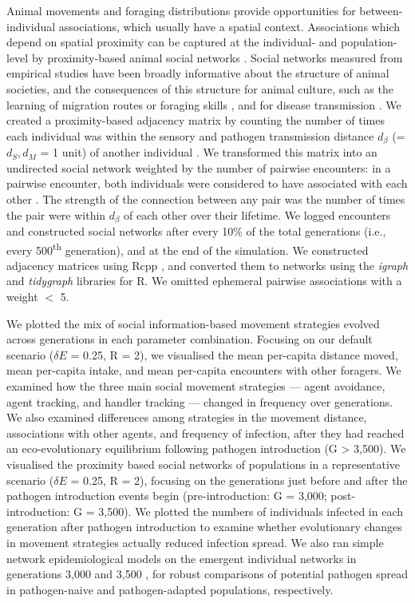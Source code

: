 Animal movements and foraging distributions provide opportunities for between-individual associations, which usually have a spatial context.
Associations which depend on spatial proximity can be captured at the individual- and population-level by proximity-based animal social networks \citep{whitehead2008,farine2015}.
Social networks measured from empirical studies have been broadly informative about the structure of animal societies, and the consequences of this structure for animal culture, such as the learning of migration routes or foraging skills \citep{aplin2012,aplin2013,cantor2021}, and for disease transmission \citep{stroeymeyt2018,albery2021,cantor2021}.
We created a proximity-based adjacency matrix by counting the number of times each individual was within the sensory and pathogen transmission distance $d_\beta$ (= $d_S, d_M$ = 1 unit) of another individual \citep{whitehead2008,wilber2022}.
We transformed this matrix into an undirected social network weighted by the number of pairwise encounters: in a pairwise encounter, both individuals were considered to have associated with each other \citep{white2017}.
The strength of the connection between any pair was the number of times the pair were within $d_\beta$ of each other over their lifetime.
We logged encounters and constructed social networks after every 10\% of the total generations (i.e., every 500\textsuperscript{th} generation), and at the end of the simulation.
We constructed adjacency matrices using Rcpp \citep[][]{eddelbuettel2013}, and converted them to networks using the \textit{igraph} \citep{csardi2006} and \textit{tidygraph} \citep{pedersen2020} libraries for R.
We omitted ephemeral pairwise associations with a weight $<$ 5.

We plotted the mix of social information-based movement strategies evolved across generations in each parameter combination.
Focusing on our default scenario ($\delta E$ = 0.25, R = 2), we visualised the mean per-capita distance moved, mean per-capita intake, and mean per-capita encounters with other foragers.
We examined how the three main social movement strategies --- agent avoidance, agent tracking, and handler tracking --- changed in frequency over generations.
We also examined differences among strategies in the movement distance, associations with other agents, and frequency of infection, after they had reached an eco-evolutionary equilibrium following pathogen introduction (G > 3,500).
We visualised the proximity based social networks of populations in a representative scenario ($\delta E$ = 0.25, R = 2), focusing on the generations just before and after the pathogen introduction events begin (pre-introduction: G = 3,000; post-introduction: G = 3,500).
We plotted the numbers of individuals infected in each generation after pathogen introduction to examine whether evolutionary changes in movement strategies actually reduced infection spread.
We also ran simple network epidemiological models on the emergent individual networks in generations 3,000 and 3,500 \autocite{bailey1975,white2017,stroeymeyt2018,wilber2022}, for robust comparisons of potential pathogen spread in pathogen-naive and pathogen-adapted populations, respectively.

